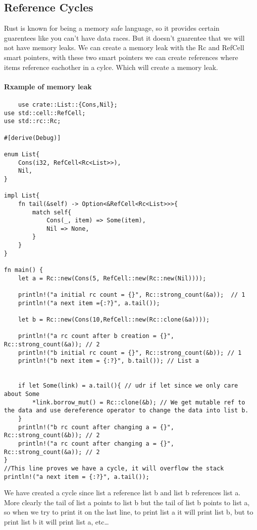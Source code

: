 \subsection{Reference Cycles}

Rust is known for being a memory safe language, so it provides certain guarentees like you can't have data races. But it doesn't guarentee that we will not have memory leaks. We can create a memory leak with the Rc and RefCell smart pointers, with these two smart pointers we can create references where items reference eachother in a cylce. Which will create a memory leak.

\paragraph*{Rxample of memory leak}\begin{lstlisting}
    use crate::List::{Cons,Nil};
use std::cell::RefCell;
use std::rc::Rc;

#[derive(Debug)]

enum List{
    Cons(i32, RefCell<Rc<List>>),
    Nil,
}

impl List{
    fn tail(&self) -> Option<&RefCell<Rc<List>>>{
        match self{
            Cons(_, item) => Some(item),
            Nil => None,
        }
    }
}

fn main() {
    let a = Rc::new(Cons(5, RefCell::new(Rc::new(Nil))));

    println!("a initial rc count = {}", Rc::strong_count(&a));  // 1
    println!("a next item ={:?}", a.tail());

    let b = Rc::new(Cons(10,RefCell::new(Rc::clone(&a))));

    println!("a rc count after b creation = {}", Rc::strong_count(&a)); // 2
    println!("b initial rc count = {}", Rc::strong_count(&b)); // 1
    println!("b next item = {:?}", b.tail()); // List a


    if let Some(link) = a.tail(){ // udr if let since we only care about Some 
        *link.borrow_mut() = Rc::clone(&b); // We get mutable ref to the data and use dereference operator to change the data into list b.
    }
    println!("b rc count after changing a = {}", Rc::strong_count(&b)); // 2
    println!("a rc count after changing a = {}", Rc::strong_count(&a)); // 2
}
//This line proves we have a cycle, it will overflow the stack
println!("a next item = {:?}", a.tail()); 
\end{lstlisting}
We have created a cycle since list a reference list b and list b references list a. More clearly the tail of list a points to list b but the tail of list b points to list a, so when we try to print it on the last line, to print list a it will print list b, but to print list b it will print list a, etc\dots

